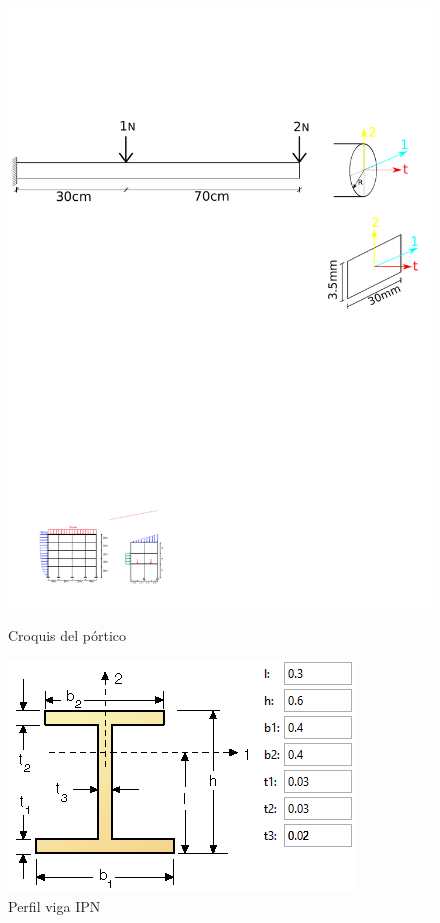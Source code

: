 \documentclass[a4paper,12pt]{article}
\begin{document}
\begin{figure}[hb]
\begin{minipage}[b]{0.5\linewidth}
    \centering
\includegraphics[width=\textwidth]{RecortePuntuable}
\caption{Croquis del pórtico}
\label{fig:croquis}
\end{minipage}
\hspace{0.5cm}
\begin{minipage}[b]{0.4\linewidth}
    \centering
\includegraphics[width=\textwidth]{Figura2.png}
\caption{Perfil viga IPN}
\label{fig:IPN}
\end{minipage}
\end{figure}
\end{document}
